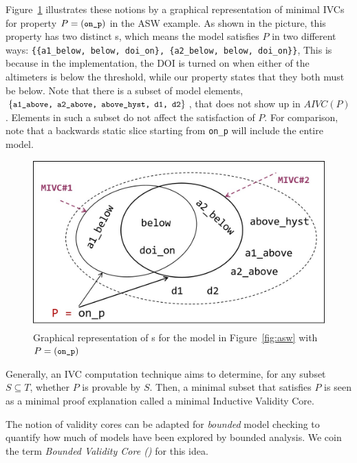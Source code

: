 Figure~\ref{fig:ivcs} illustrates these notions by a graphical representation of minimal IVCs for property $P = ({\small{\texttt{on\_p}}})$ in the ASW example. As shown in the picture, this property has two distinct \mivc s, which means the model satisfies $P$ in two different ways:  {\small \texttt{\{\{a1\_below, below, doi\_on\}, \{a2\_below, below, doi\_on\}\}}}, This is because in the implementation, the DOI is turned on when either of the altimeters is below the threshold, while our property states that they both must be below.
Note that there is a subset of model elements, $\{{\small \texttt{a1\_above, a2\_above, above\_hyst, d1, d2}}\}$, that does not show up in $AIVC(P)$. Elements in such a subset
do not affect the satisfaction of $P$.  For comparison, note that a backwards static slice starting from {\small{\texttt{on\_p}}} will include the entire model.

\begin{figure}[t]
 \centering
  \includegraphics[width=0.70\columnwidth]{figs/ivcs.jpg}
  \vspace{-0.1in}
  \caption{Graphical representation of \mivc s for the model in Figure~\ref{fig:asw}
  with  $P = ({\small \texttt{on\_p}})$}
  \label{fig:ivcs}
\end{figure}


Generally, an IVC computation technique aims to determine, for any subset $S \subseteq T$, whether $P$ is provable by $S$. Then, a minimal subset that satisfies $P$ is seen as a minimal proof explanation called a minimal Inductive Validity Core.

The notion of validity cores can be adapted for \emph{bounded} model checking to quantify how much of models have been explored by bounded analysis. We coin the term \emph{Bounded Validity Core (\bvc)} for this idea.

